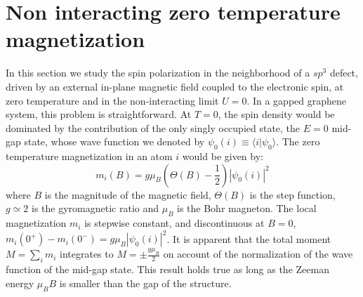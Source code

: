 \documentclass[aps,prb,twocolumn,superscriptaddress]{revtex4-1}
\newcommand{\braket}[2]{\langle#1|#2\rangle}
\begin{document}
\section{Non interacting zero temperature magnetization}
\label{sec:Phys}
In this section we study the spin polarization in the neighborhood of a $sp^3$ defect, driven by an external in-plane magnetic field coupled to the electronic spin, at zero temperature and in the non-interacting limit $U=0$.
In a gapped graphene system, this problem is straightforward. At $T=0$,  the
spin density would be dominated by the contribution of the only singly occupied
state, the $E=0$ mid-gap state, whose wave function we denoted by $\psi_0(i)\equiv \braket{i}{\psi_0}$.
The zero temperature magnetization in an atom $i$ would be given by:
\begin{equation}
m_i(B) = g\mu_B \left(\Theta(B)-\frac{1}{2}\right) |\psi_0(i)|^2
\end{equation}
where $B$ is the magnitude of the magnetic field, $\Theta(B)$ is the step function, $g\simeq2$ is the gyromagnetic ratio and $\mu_B$ is the Bohr magneton. The local magnetization $m_i$ is stepwise constant, and discontinuous at $B=0$, $m_i(0^+)-m_i(0^-)= g\mu_B |\psi_0(i)|^2$.
It is apparent that the total moment $M=\sum_i m_i$ integrates to $M=\pm \frac{g\mu_B}{2}$ on account of the normalization of the wave function of the mid-gap state. This result holds true as long as the Zeeman energy $\mu_B B$  is smaller than the gap of the structure.
\end{document}
